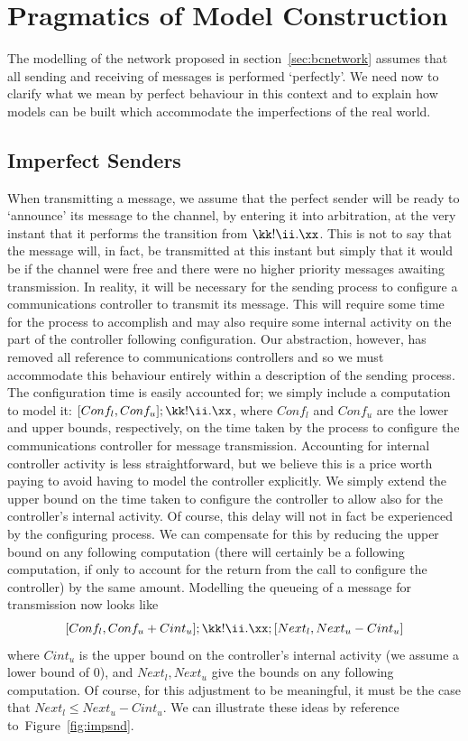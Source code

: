 \section{Pragmatics of Model Construction\label{sec:prprac}}
The modelling of the network proposed in section~\ref{sec:bcnetwork}
assumes that all sending and receiving of messages is performed
`perfectly'.  We need now to clarify what we mean by perfect behaviour
in this context and to explain how models can be built which
accommodate the imperfections of the real world.
\subsection{Imperfect Senders}
When transmitting a message, we assume that the
perfect sender will be ready to `announce' its message to the channel,
by entering it into arbitration, at the very instant that it performs the
transition from $\kk!\ii.\xx$. This is not to say that the message will,
in fact, be transmitted at this instant but simply that it would be if the
channel were free and there were no higher priority messages awaiting 
transmission. In reality, it will be necessary for
the sending process to configure a communications controller to transmit
its message. This will require some time for the process to accomplish and
may also require some internal activity on the part of the 
controller following configuration. Our abstraction, however, 
has removed all reference 
to communications controllers and so we must accommodate this behaviour entirely
within a description of the sending process. The configuration time is 
easily accounted for; we simply include a computation to model it:
$[Conf_l, Conf_u] ; \kk!\ii.\xx$, where $Conf_l$ and $Conf_u$ are
the lower and upper bounds, respectively, on the time taken by the process
to configure the communications controller for message transmission.
Accounting for internal controller activity is less straightforward,
but we believe this is a price worth paying to avoid having to model the
controller explicitly. We simply extend the upper bound on the time taken
to configure the controller to allow also for the controller's internal
activity. Of course, this delay will not in fact be experienced by the
configuring process. We can compensate for this by reducing the upper
bound on any following computation (there will certainly be a following
computation, if only to account for the return from the call to
configure the controller) by the same amount. Modelling the queueing
of a message for 
transmission now looks like
\[
[Conf_l, Conf_u + Cint_u] ; \kk!\ii.\xx ; [Next_l, Next_u - Cint_u]
\]
where $Cint_u$ is the upper bound on the controller's internal
activity (we assume a lower bound of 0), and $Next_l, Next_u$ give the
bounds on any following computation. Of course, for this adjustment to
be meaningful, it must be the case that $Next_l \leq Next_u - Cint_u$.
We can illustrate these ideas by reference to~Figure~\ref{fig:impsnd}.

